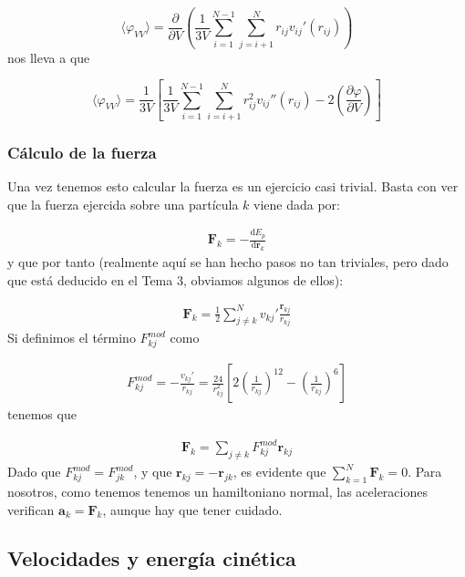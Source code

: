 \documentclass[11pt]{article}
\newcommand{\rn}{\mathbf{r}}
\newcommand{\Fn}{\mathbf{F}}
\newcommand{\an}{\mathbf{a}}
\newcommand{\parentesis}[1]{\left( #1  \right)}
\newcommand{\parciales}[2]{\frac{\partial #1}{\partial #2}}
\newcommand{\ccorchetes}[1]{\left[ #1  \right]}
\newcommand{\D}{\mathrm{d}}
\newcommand{\derivadas}[2]{\frac{\D #1}{\D #2}}
\begin{document}
\begin{equation}
	\langle \varphi_{VV} \rangle =\parciales{}{V} \parentesis{\frac{1}{3V} \sum_{i=1}^{N-1}\sum_{j=i+1}^{N}  r_{ij} v_{ij}'(r_{ij})}
\end{equation}
nos lleva a que

\begin{equation}
	\langle \varphi_{VV} \rangle = \frac{1}{3V} \ccorchetes{\frac{1}{3V} \sum_{i=1}^{N-1} \sum_{i=i+1}^{N} r_{ij}^2 v_{ij}''(r_{ij})	- 2 \parentesis{\parciales{\varphi}{V}}}
\end{equation}

\subsubsection{Cálculo de la fuerza}

Una vez tenemos esto calcular la fuerza es un ejercicio casi trivial. Basta con ver que la fuerza ejercida sobre una partícula $k$ viene dada por:

\begin{eqnarray}
	\Fn_{k} = - \derivadas{E_p}{\rn_k}
\end{eqnarray}
y que por tanto (realmente aquí se han hecho pasos no tan triviales, pero dado que está deducido en el Tema 3, obviamos algunos de ellos):

\begin{eqnarray}
	\Fn_{k} =\frac{1}{2}  \sum_{j\neq k}^N v_{kj}' \frac{\rn_{kj}}{r_{kj}}
\end{eqnarray}
Si definimos el término $F_{kj}^{mod}$ como

\begin{eqnarray}
	F_{kj}^{mod} =- \frac{v_{kj}'}{r_{kj}} = \frac{24}{r_{kj}^2} \ccorchetes{2 \parentesis{\frac{1}{r_{kj}}}^{12}-\parentesis{\frac{1}{r_{kj}}}^6}
\end{eqnarray}
tenemos que 

\begin{eqnarray}
	\Fn_{k} = \sum_{j \neq k} F_{kj}^{mod} \rn_{kj}
\end{eqnarray}
Dado que $F_{kj}^{mod}=F_{jk}^{mod}$, y que $\rn_{kj}=-\rn_{jk}$, es evidente que $\sum_{k=1}^N \Fn_k=0$. Para nosotros, como tenemos tenemos un hamiltoniano normal, las aceleraciones verifican $\an_k = \Fn_k$, aunque hay que tener cuidado.


\subsection{Velocidades y energía cinética}
\end{document}
